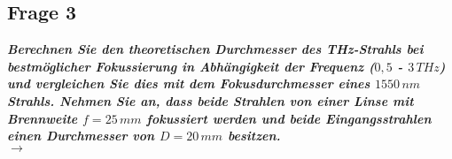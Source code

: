 \subsection{\label{subsec:FZV3}Frage 3}
\textbf{\textit{Berechnen Sie den theoretischen Durchmesser des THz-Strahls bei bestmöglicher
Fokussierung in Abhängigkeit der Frequenz ($0,5$ - $3\,\si{THz}$) und vergleichen Sie dies
mit dem Fokusdurchmesser eines $1550\,\si{nm}$ Strahls. Nehmen Sie an, dass beide Strahlen von einer Linse mit 
Brennweite $f = 25\,\si{mm}$ fokussiert werden und beide
Eingangsstrahlen einen Durchmesser von $D = 20\,\si{mm}$ besitzen.}}\\
$\rightarrow$